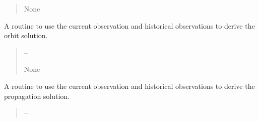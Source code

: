\documentclass[letterpaper,11pt,english]{sphinxmanual}
\begin{document}
\begin{savenotes}
\begin{fulllineitems}
\begin{savenotes}
\begin{fulllineitems}
\begin{quote}
\begin{description}
\sphinxAtStartPar
None

\end{description}\end{quote}

\end{fulllineitems}\end{savenotes}


\begin{savenotes}\begin{fulllineitems}
\label{\detokenize{code/opihiexarata.gui.manual:opihiexarata.gui.manual.OpihiManualWindow.__connect_push_button_orbit_solve_orbit}}
\pysigstartsignatures
{}
\pysigstopsignatures
\sphinxAtStartPar
A routine to use the current observation and historical observations
to derive the orbit solution.
\begin{quote}\begin{description}
\sphinxAtStartPar
{} – 

\sphinxAtStartPar
None

\end{description}\end{quote}

\end{fulllineitems}\end{savenotes}


\begin{savenotes}\begin{fulllineitems}
\label{\detokenize{code/opihiexarata.gui.manual:opihiexarata.gui.manual.OpihiManualWindow.__connect_push_button_photometry_solve_photometry}}
\pysigstartsignatures
{}
\pysigstopsignatures
\sphinxAtStartPar
A routine to use the current observation and historical observations
to derive the propagation solution.
\begin{quote}\begin{description}
\sphinxAtStartPar
{} – 


\end{description}
\end{quote}
\end{fulllineitems}
\end{savenotes}
\end{fulllineitems}
\end{savenotes}
\end{document}
